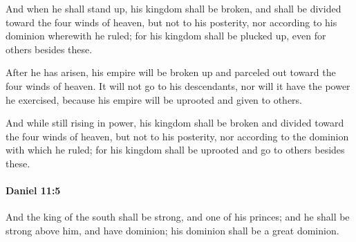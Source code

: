 			\begin{versebox}
					\item[BHS] 
					\item[LXX] 
					\item[ASV] And when he shall stand up, his kingdom shall be broken, and shall be divided toward the four winds of heaven, but not to his posterity, nor according to his dominion wherewith he ruled; for his kingdom shall be plucked up, even for others besides these.
					\item[NIV] After he has arisen, his empire will be broken up and parceled out toward the four winds of heaven. It will not go to his descendants, nor will it have the power he exercised, because his empire will be uprooted and given to others.
					\item[NRSV] And while still rising in power, his kingdom shall be broken and divided toward the four winds of heaven, but not to his posterity, nor according to the dominion with which he ruled; for his kingdom shall be uprooted and go to others besides these.
			\end{versebox}

		\paragraph{Daniel 11:5} %
			\label{DANIEL-11-5}

			And the king of the south shall be strong, and one of his princes; and he shall be strong above him, and have dominion; his dominion shall be a great dominion.

